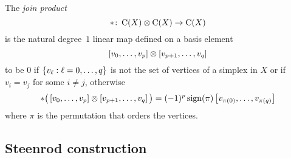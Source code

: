 The \textit{join product}
\[
\ast \colon \operatorname{C}(X) \otimes \operatorname{C}(X) \to \operatorname{C}(X)
\]
is the natural degree~$1$ linear map defined on a basis element
\[
[v_0, \dots, v_p] \otimes [v_{p+1}, \dots, v_q]
\]
to be $0$ if $\{v_\ell : \ell = 0, \dots, q\}$ is not the set of vertices of a simplex in $X$ or if $v_i = v_j$ for some $i \neq j$,
otherwise
\[
\ast \big(\left[v_0, \dots, v_p \right] \otimes \left[v_{p+1}, \dots, v_q\right]\big) =
(-1)^{p} \operatorname{sign}(\pi) \left[v_{\pi(0)}, \dots, v_{\pi(q)}\right]
\]
where $\pi$ is the permutation that orders the vertices.

%	

\subsection{Steenrod construction} \label{ss:cup-i}

